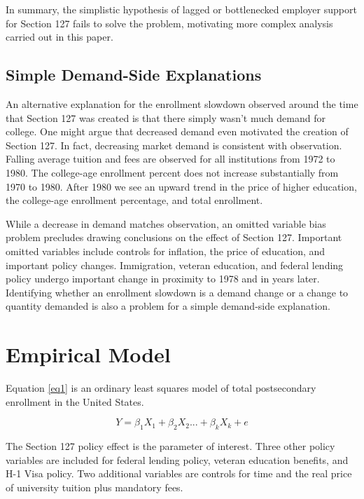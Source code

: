 \documentclass[review]{elsarticle}
\begin{document}
    In summary, the simplistic hypothesis of lagged or bottlenecked employer support for Section 127 fails to solve the problem,
    motivating more complex analysis carried out in this paper.

    \subsection{Simple Demand-Side Explanations}
    An alternative explanation for the enrollment slowdown observed around the time that Section 127 was created is that there simply wasn't much demand for college.
    One might argue that decreased demand even motivated the creation of Section 127.
    In fact, decreasing market demand is consistent with observation.
    Falling average tuition and fees are observed for all institutions from 1972 to 1980.
    The college-age enrollment percent does not increase substantially from 1970 to 1980.
    After 1980 we see an upward trend in the price of higher education, the college-age enrollment percentage, and total enrollment.

    While a decrease in demand matches observation,
    an omitted variable bias problem precludes drawing conclusions on the effect of Section 127.
    Important omitted variables include controls for inflation, the price of education, and important policy changes.
    Immigration, veteran education, and federal lending policy undergo important change in proximity to 1978 and in years later.
    Identifying whether an enrollment slowdown is a demand change or a change to quantity demanded is also a problem for a simple demand-side explanation.

    \section{Empirical Model}

    Equation \ref{eq1} is an ordinary least squares model of total postsecondary enrollment in the United States.

    \begin{equation}
        Y = \beta_1X_1+\beta_2X_2...+\beta_kX_k+e
        \label{eq1}
    \end{equation}

    The Section 127 policy effect is the parameter of interest.
    Three other policy variables are included for federal lending policy, veteran education benefits, and H-1 Visa policy.
    Two additional variables are controls for time and the real price of university tuition plus mandatory fees.
\end{document}
